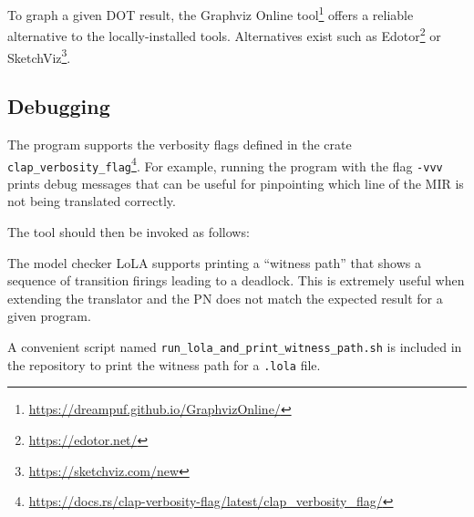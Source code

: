 To graph a given DOT result,
the Graphviz Online tool\footnote{\url{https://dreampuf.github.io/GraphvizOnline/}}
offers a reliable alternative to the locally-installed tools.
Alternatives exist such as Edotor\footnote{\url{https://edotor.net/}}
or SketchViz\footnote{\url{https://sketchviz.com/new}}.

\subsection{Debugging}
\label{sec:debugging}

The program supports the verbosity flags defined in the crate
\texttt{clap\_verbosity\_flag}\footnote{\url{https://docs.rs/clap-verbosity-flag/latest/clap\_verbosity\_flag/}}.
For example, running the program with the flag \texttt{-vvv} prints debug messages
that can be useful for pinpointing which line of the \acrshort{MIR} is not being translated correctly.

The tool should then be invoked as follows:


The model checker  \acrshort{LoLA} supports printing a ``witness path''
that shows a sequence of transition firings leading to a deadlock.
This is extremely useful when extending the translator and
the \acrshort{PN} does not match the expected result for a given program.

A convenient script named \texttt{run\_lola\_and\_print\_witness\_path.sh}
is included in the repository to print the witness path for a \texttt{.lola} file.